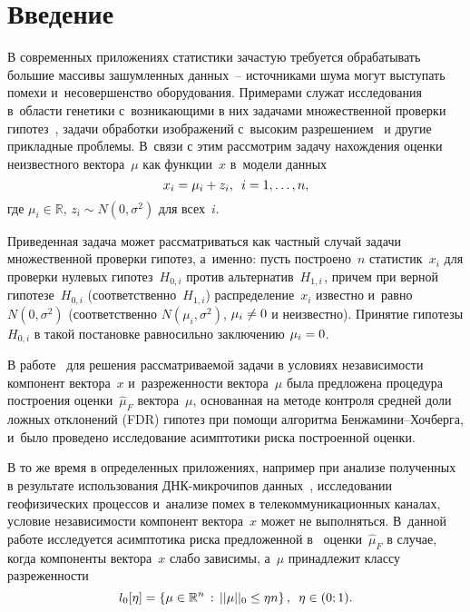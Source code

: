 

  



\thispagestyle{headings}

\begin{multicols}{2}

\label{st\stat}


\section{Введение}


В современных приложениях статистики за\-час\-тую требуется обрабатывать большие 
массивы зашумленных данных~-- источниками шума могут выступать помехи 
и~несовершенство оборудования. Примерами служат исследования в~об\-ласти генетики 
с~возникающими в них задачами множественной проверки гипотез~\cite{MultipleTesting}, задачи обработки изображений 
с~высоким разрешением~\cite{FDRImage} и другие прикладные проб\-ле\-мы. В~связи с этим рассмотрим задачу 
нахождения оценки неизвестного вектора~$\mu$ как функции~$x$ в~модели данных
$$
x_i = \mu_i + z_i, \enskip i=1,\ldots,n,
$$
где $\mu_i\in\mathbb{R}$, $z_i \sim N(0,\sigma^2)$ для всех~$i$.

Приведенная задача может рассматриваться как частный случай задачи множественной 
проверки гипотез, а~именно: пусть построено~$n$ статистик~$x_i$ для проверки 
нулевых гипотез~$H_{0,i}$ против альтернатив~$H_{1,i\,}$, причем при 
верной гипотезе~$H_{0, i}$ (соответственно~$H_{1, i}$) распределение~$x_i$ 
известно и~равно $N(0,\sigma^2)$ (соответственно $N(\mu_i,\sigma^2)$, 
$\mu_i\hm\neq0$ и неизвестно). Принятие гипотезы $H_{0,i}$ в такой постановке 
равносильно заключению $\mu_i\hm=0$.

В работе~\cite{AdaptingFDR} для решения рассматриваемой задачи в условиях 
независимости компонент вектора~$x$ и~разреженности вектора~$\mu$ была 
предложена процедура построения оценки~$\hat{\mu}_F$ вектора~$\mu$, основанная 
на методе контроля средней доли ложных отклонений (FDR) 
гипотез при помощи алгоритма Бен\-жа\-ми\-ни--Хоч\-бер\-га,
и~было проведено исследование асимптотики риска построенной оценки.

В то же время в определенных приложениях, например
при анализе полученных в результате использования ДНК-мик\-ро\-чи\-пов 
данных~\cite{ResultsOnFDRUnderDependence}, исследовании геофизических процессов 
и~анализе помех в телекоммуникационных каналах, условие независимости компонент 
вектора~$x$ может не выполняться. В~данной работе исследуется асимптотика риска 
предложенной в~\cite{AdaptingFDR} оценки~$\hat{\mu}_F$ в случае, когда 
компоненты вектора~$x$ слабо зависимы, а~$\mu$ принадлежит классу разреженности
$$
l_0[\eta] = \left\{\mu\in\mathbb{R}^n\,:\, ||\mu||_0 \leq \eta n\right\}, \enskip
\eta\in(0;1).
$$



\end{multicols}
